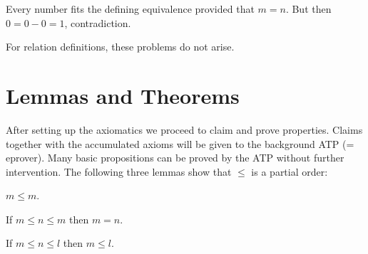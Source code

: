 \documentclass[11pt]{article}
\begin{document}
Every number fits the defining equivalence provided that $m = n$.
But then $0 = 0 - 0 = 1$, contradiction.

For relation definitions, these problems do not arise.

\section{Lemmas and Theorems}

After setting up the axiomatics we proceed to claim and prove
properties. Claims together with the accumulated axioms will
be given to the background ATP (= eprover). Many basic
propositions can be proved by the ATP without further intervention.
The following three lemmas show that $\leq$ is a partial order:

\begin{forthel}

\begin{lemma} $m \leq m$.
\end{lemma}

\begin{lemma} If $m \leq n \leq m$
then $m = n$.
\end{lemma}

\begin{lemma} If $m \leq n \leq l$
then  $m \leq l$.
\end{lemma}
\end{forthel}
\end{document}
